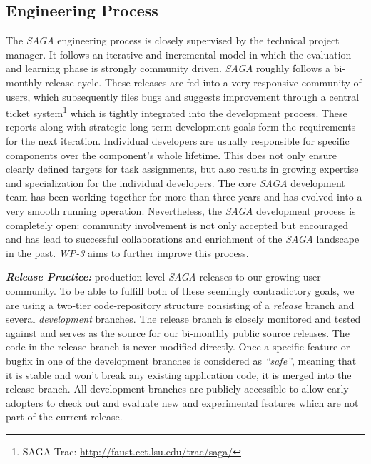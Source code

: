 \documentclass[a4paper,10pt]{article}
\newcommand{\I}[1]{\textit{#1}}
\newcommand{\BI}[1]{\textbf{\textit{#1}}}
\newcommand{\sagaspec}{\textit{SAGA}\xspace}
\newcommand{\sagaimpl}{\textit{SAGA}\xspace}
\newcommand{\spec}{\sagaspec}
\newcommand{\impl}{\sagaimpl}
\begin{document}


\subsection{Engineering Process\label{engineering}}

The \impl engineering process is closely supervised by the technical project manager. It follows an iterative and incremental model in which the evaluation and learning phase is strongly community driven. \impl roughly follows a bi-monthly release cycle. These releases are fed into a very responsive community of users, which subsequently files bugs and suggests improvement through a central ticket system\footnote{SAGA Trac: \url{http://faust.cct.lsu.edu/trac/saga/}} which is tightly integrated into the development process. These reports along with strategic long-term development goals form the requirements for the next iteration. Individual developers are usually responsible for specific components over the component's whole lifetime. This does not only ensure clearly defined targets for task assignments, but also results in growing expertise and specialization for the individual developers. The core \impl development team has been working together for more than three years and has evolved into a very smooth running operation. Nevertheless, the \impl development process is completely open: community involvement is not only accepted but encouraged and has lead to successful collaborations and enrichment of the \impl landscape in the past. \I{WP-3} aims to further improve this process.

\BI{Release
  Practice:} %
production-level \impl releases to our growing user community. To be
able to fulfill both of these seemingly contradictory goals, we are
using a two-tier code-repository structure consisting of a \I{release}
branch and several \I{development} branches. The release branch is
closely monitored and tested against and serves as the source for our
bi-monthly public source releases. The code in the release branch is
never modified directly. Once a specific feature or bugfix in one of
the development branches is considered as \I{``safe''}, meaning that
it is stable and won't break any existing application code, it is
merged into the release branch. All development branches are publicly
accessible to allow early-adopters to check out and evaluate new and
experimental features which are not part of the current release.
\end{document}
